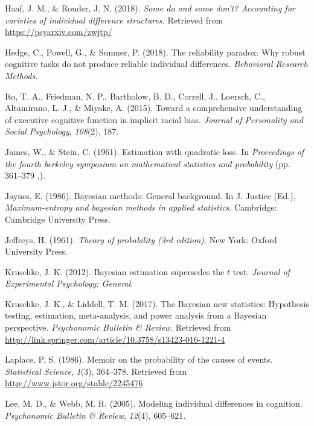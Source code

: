 \documentclass[english,man]{apa6}
\theoremstyle{definition}
\theoremstyle{definition}
\theoremstyle{remark}
\begin{document}
\hypertarget{ref-Haaf:Rouder:submitted}{}
Haaf, J. M., \& Rouder, J. N. (2018). \emph{Some do and some don't?
Accounting for varieties of individual difference structures.} Retrieved
from \url{https://psyarxiv.com/zwjtp/}

\hypertarget{ref-Hedge:etal:2018}{}
Hedge, C., Powell, G., \& Sumner, P. (2018). The reliability paradox:
Why robust cognitive tasks do not produce reliable individual
differences. \emph{Behavioral Research Methods}.

\hypertarget{ref-Ito:etal:2015}{}
Ito, T. A., Friedman, N. P., Bartholow, B. D., Correll, J., Loersch, C.,
Altamirano, L. J., \& Miyake, A. (2015). Toward a comprehensive
understanding of executive cognitive function in implicit racial bias.
\emph{Journal of Personality and Social Psychology}, \emph{108}(2), 187.

\hypertarget{ref-James:Stein:1961}{}
James, W., \& Stein, C. (1961). Estimation with quadratic loss. In
\emph{Proceedings of the fourth berkeley symposium on mathematical
statistics and probability} (pp. 361--379 ,).

\hypertarget{ref-Jaynes:1986}{}
Jaynes, E. (1986). Bayesian methods: General background. In J. Justice
(Ed.), \emph{Maximum-entropy and bayesian methods in applied
statistics}. Cambridge: Cambridge University Press.

\hypertarget{ref-Jeffreys:1961}{}
Jeffreys, H. (1961). \emph{Theory of probability (3rd edition)}. New
York: Oxford University Press.

\hypertarget{ref-Kruschke:2012}{}
Kruschke, J. K. (2012). Bayesian estimation supersedes the \(t\) test.
\emph{Journal of Experimental Psychology: General}.

\hypertarget{ref-Kruschke:Liddell:2017}{}
Kruschke, J. K., \& Liddell, T. M. (2017). The Bayesian new statistics:
Hypothesis testing, estimation, meta-analysis, and power analysis from a
Bayesian perspective. \emph{Psychonomic Bulletin \& Review}. Retrieved
from \url{http://link.springer.com/article/10.3758/s13423-016-1221-4}

\hypertarget{ref-Laplace:1986}{}
Laplace, P. S. (1986). Memoir on the probability of the causes of
events. \emph{Statistical Science}, \emph{1}(3), 364--378. Retrieved
from \url{http://www.jstor.org/stable/2245476}

\hypertarget{ref-Lee:Webb:2005}{}
Lee, M. D., \& Webb, M. R. (2005). Modeling individual differences in
cognition. \emph{Psychonomic Bulletin \& Review}, \emph{12}(4),
605--621.
\end{document}
